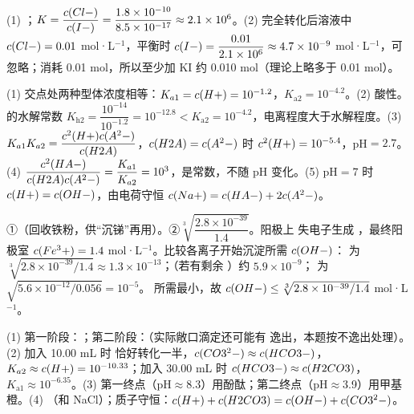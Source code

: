 \begin{jiexilist}
\item (1) ；$K=\dfrac{c(Cl-)}{c(I-)}=\dfrac{1.8\times10^{-10}}{8.5\times10^{-17}}\approx2.1\times10^6$。(2) 完全转化后溶液中 $c(Cl-)=0.01$ mol·L$^{-1}$，平衡时 $c(I-)=\dfrac{0.01}{2.1\times10^6}\approx4.7\times10^{-9}$ mol·L$^{-1}$，可忽略；消耗  0.01 mol，所以至少加 KI 约 0.010 mol（理论上略多于 0.01 mol）。
\item (1) 交点处两种型体浓度相等：$K_{a1}=c(H+)=10^{-1.2}$，$K_{\text{a}2}=10^{-4.2}$。(2) 酸性。 的水解常数 $K_{\text{h}2}=\dfrac{10^{-14}}{10^{-1.2}}=10^{-12.8}<K_{\text{a}2}=10^{-4.2}$，电离程度大于水解程度。(3) $K_{a1}K_{a2}=\dfrac{c^2(H+)c(A^2-)}{c(H2A)}$，$c(H2A)=c(A^2-)$ 时 $c^2(H+)=10^{-5.4}$，pH$=2.7$。(4) $\dfrac{c^2(HA-)}{c(H2A)c(A^2-)}=\dfrac{K_{a1}}{K_{a2}}=10^{3}$，是常数，不随 pH 变化。(5) pH$=7$ 时 $c(H+)=c(OH-)$，由电荷守恒 $c(Na+)=c(HA-)+2c(A^2-)$。
\item ①（回收铁粉，供“沉锑”再用）。②$\sqrt[3]{\dfrac{2.8\times10^{-39}}{1.4}}$。阳极上  失电子生成 ，最终阳极室 $c(Fe^3+)=1.4$ mol·L$^{-1}$。比较各离子开始沉淀所需 $c(OH-)$： 为 $\sqrt[3]{2.8\times10^{-39}/1.4}\approx1.3\times10^{-13}$；（若有剩余 ）约 $5.9\times10^{-9}$； 为 $\sqrt{5.6\times10^{-12}/0.056}=10^{-5}$。 所需最小，故 $c(OH-)\le\sqrt[3]{2.8\times10^{-39}/1.4}$ mol·L$^{-1}$。
\item (1) 第一阶段：；第二阶段：（实际敞口滴定还可能有  逸出，本题按不逸出处理）。(2) 加入 10.00 mL 时  恰好转化一半，$c(CO3^2-)\approx c(HCO3-)$，$K_{a2}\approx c(H+)=10^{-10.33}$；加入 30.00 mL 时 $c(HCO3-)\approx c(H2CO3)$，$K_{\text{a}1}\approx10^{-6.35}$。(3) 第一终点（pH$\approx$8.3）用酚酞；第二终点（pH$\approx$3.9）用甲基橙。(4) （和 NaCl）；质子守恒：$c(H+)+c(H2CO3)=c(OH-)+c(CO3^2-)$。
\end{jiexilist}
